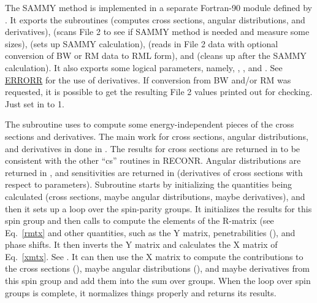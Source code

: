 The SAMMY method is implemented in a separate Fortran-90
module 
defined by .  It exports the subroutines
 (computes cross
sections, angular distributions, and derivatives),
 (scans File 2
to see if SAMMY method is needed and measure some sizes),
 (sets up SAMMY
calculation), 
(reads in File 2 data with optional conversion of
BW
or RM data to
RML form), and
(cleans up after the SAMMY calculation).  It also exports some
logical parameters, namely,
,
,
 and
.
  See
\hyperlink{sERRORRhy}{ERRORR} for the use
of derivatives.  If conversion from
BW and/or RM was requested, it is possible to get the
resulting File 2 values printed out for checking.  Just
set  in  to 1.

The  subroutine
uses  to compute
some energy-independent pieces of the cross sections and
derivatives.  The main work for cross sections, angular
distributions, and derivatives in done in
.  The
results for cross sections are returned in
 to be
consistent with the other ``cs'' routines in RECONR.  Angular
distributions are returned in , and sensitivities
are returned in  (derivatives of cross sections
with respect to parameters).  Subroutine
 starts
by initializing the quantities being calculated (cross sections,
maybe angular distributions, maybe derivatives), and then it
sets up a loop over the spin-parity groups.  It initializes the
results for this spin group and then calls
 to compute the elements
of the R-matrix (see Eq.~\ref{rmtx} and other
quantities, such as the Y matrix, penetrabilities
(), and phase shifts.  It then inverts the
Y matrix and calculates the X matrix of Eq.~\ref{xmtx}.
See .  It can then use the X matrix to compute
the contributions to the cross sections (),
maybe angular distributions (), and maybe
derivatives from this spin group and add them into the sum
over groups.  When the loop over spin groups is complete,
it normalizes things properly and returns its results.

